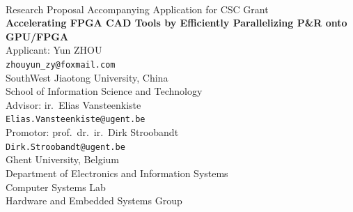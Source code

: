 \documentclass[a4paper,oneside,12pt]{article}
\begin{document}

\thispagestyle{empty}

\begin{center}
\mbox{}\\\vspace{5mm}
{\large Research Proposal Accompanying Application for CSC Grant}\\ [45mm]
%
{\bf\Large Accelerating FPGA CAD Tools by Efficiently Parallelizing P\&R onto GPU/FPGA} \\
\vspace{45mm}
\large Applicant: Yun ZHOU \\
\vspace{2mm}
\small\texttt{zhouyun\_zy@foxmail.com} \\
\vspace{10mm}
\normalsize SouthWest Jiaotong University, China \\
\normalsize School of Information Science and Technology\\
\vspace{10mm}
\large Advisor: ir.\ Elias Vansteenkiste \\
\small\texttt{Elias.Vansteenkiste@ugent.be} \\
\vspace{2mm}
\large Promotor: prof.\ dr.\ ir.\ Dirk Stroobandt \\
\small\texttt{Dirk.Stroobandt@ugent.be} \\
\vspace{10mm}
\normalsize Ghent University, Belgium \\
\normalsize Department of Electronics and Information Systems\\
\normalsize Computer Systems Lab\\
\normalsize Hardware and Embedded Systems Group
\end{center}

\newpage

\tableofcontents
\end{document}

